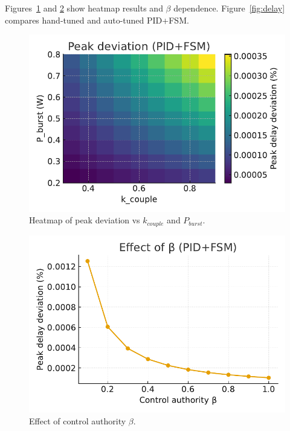 \documentclass[conference]{IEEEtran}
\begin{document}
Figures~\ref{fig:heatmap} and \ref{fig:beta} show heatmap results
and $\beta$ dependence. Figure~\ref{fig:delay} compares hand-tuned and auto-tuned PID+FSM.

\begin{figure}[h]
\centering
\includegraphics[width=0.9\columnwidth]{figs/heatmap.pdf}
\caption{Heatmap of peak deviation vs $k_{couple}$ and $P_{burst}$.}
\label{fig:heatmap}
\end{figure}

\begin{figure}[h]
\centering
\includegraphics[width=0.9\columnwidth]{figs/beta_curve.pdf}
\caption{Effect of control authority $\beta$.}
\label{fig:beta}
\end{figure}
\end{document}
